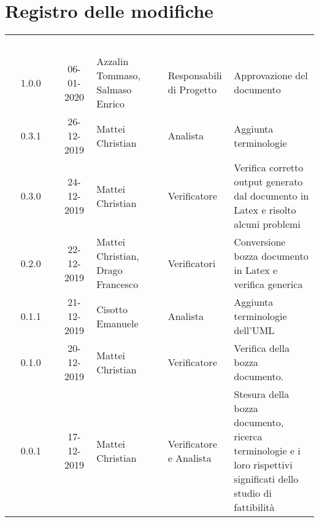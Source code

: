 \section*{Registro delle modifiche}
{
\renewcommand{\arraystretch}{1.5}
\centering
\begin{longtable}{ c c  C{4cm}  C{3cm} C{4cm}}
\textcolor{white}{\textbf{Versione}} & \textcolor{white}{\textbf{Data}} & \textcolor{white}{\textbf{Nominativo}} & \textcolor{white}{\textbf{Ruolo}} & \textcolor{white}{\textbf{Descrizione}}\\	


1.0.0 & 06-01-2020 & Azzalin Tommaso, Salmaso Enrico & Responsabili di Progetto & Approvazione del documento \\

0.3.1 & 26-12-2019 & Mattei Christian & Analista & Aggiunta terminologie \\

0.3.0 & 24-12-2019 & Mattei Christian & Verificatore & Verifica corretto output generato dal documento in Latex e risolto alcuni problemi\\

0.2.0 & 22-12-2019 & Mattei Christian, Drago Francesco & Verificatori &  Conversione bozza documento in Latex e verifica generica\\

0.1.1 & 21-12-2019 & Cisotto Emanuele & Analista & Aggiunta terminologie dell'UML \\
		
0.1.0 & 20-12-2019 & Mattei Christian & Verificatore & Verifica della bozza documento.  \\
		
0.0.1 & 17-12-2019 & Mattei Christian & Verificatore e Analista & Stesura della bozza documento, ricerca terminologie e i loro rispettivi significati dello studio di fattibilità \\
		
		
\end{longtable}
}